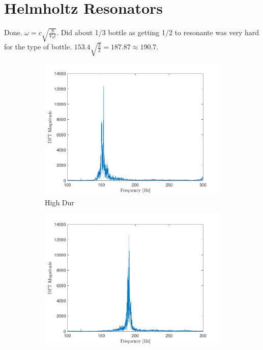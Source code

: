 \documentclass[10pt]{article}
\begin{document}
\section{Helmholtz Resonators}
Done. $\omega = c\sqrt{\frac{S}{V_0l}}$. Did about 1/3 bottle as getting 1/2 to resonante was very hard for the type of bottle. $153.4\sqrt{\frac{3}{2}} = 187.87 \approx 190.7$.

\begin{figure}[ht]
    \centering
    \begin{subfigure}[b]{0.48\textwidth}
        \includegraphics[width=\textwidth]{problem6_empty_bottle_resonance_spectra.pdf}
        \caption{High Dur}
    \end{subfigure}
    \quad
    \begin{subfigure}[b]{0.48\textwidth}
        \includegraphics[width=\textwidth]{problem6_filled_bottle_resonance_spectra.pdf}

\end{subfigure}
\end{figure}
\end{document}
